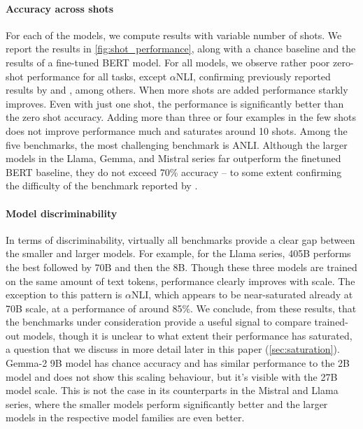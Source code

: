 \paragraph{Accuracy across shots}
For each of the models, we compute results with variable number of shots.
We report the results in \cref{fig:shot_performance}, along with a chance baseline and the results of a fine-tuned BERT model.
For all models, we observe rather poor zero-shot performance for all tasks, except $\alpha$NLI, confirming previously reported results by \citet{ohmer2024form} and \citet{weber-etal-2023-mind}, among others.
When more shots are added performance starkly improves.
Even with just one shot, the performance is significantly better than the zero shot accuracy.
Adding more than three or four examples in the few shots does not improve performance much and saturates around 10 shots. 
Among the five benchmarks, the most challenging benchmark is ANLI.
Although the larger models in the Llama, Gemma, and Mistral series far outperform the finetuned BERT baseline, they do not exceed 70\% accuracy -- to some extent confirming the difficulty of the benchmark reported by \citet{brown2020language}.

\paragraph{Model discriminability}
In terms of discriminability, virtually all benchmarks provide a clear gap between the smaller and larger models.
For example, for the Llama series, 405B performs the best followed by 70B and then the 8B.
Though these three models are trained on the same amount of text tokens, performance clearly improves with scale.
The exception to this pattern is $\alpha$NLI, which appears to be near-saturated already at 70B scale, at a performance of around 85\%.
We conclude, from these results, that the benchmarks under consideration provide a useful signal to compare trained-out models, though it is unclear to what extent their performance has saturated, a question that we discuss in more detail later in this paper (\cref{sec:saturation}).
Gemma-2 9B model has chance accuracy and has similar performance to the 2B model and does not show this scaling behaviour, but it's visible with the 27B model scale. This is not the case in its counterparts in the Mistral and Llama series, where the smaller models perform significantly better and the larger models in the respective model families are even better.

